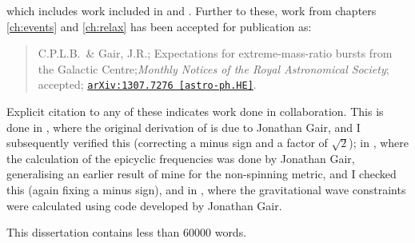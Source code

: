 which includes work included in  and . Further to these, work from chapters \ref{ch:events} and \ref{ch:relax} has been accepted for publication as:
\begin{quote}
C.P.L.B.\ \& Gair, J.R.; Expectations for extreme-mass-ratio bursts from the Galactic Centre;{\it Monthly Notices of the Royal Astronomical Society}; accepted; \href{http://arxiv.org/abs/1307.7276}{\tt arXiv:1307.7276 [astro-ph.HE]}.
\end{quote}
Explicit citation to any of these indicates work done in collaboration. This is done in , where the original derivation of  is due to Jonathan Gair, and I subsequently verified this (correcting a minus sign and a factor of $\sqrt{2}$); in , where the calculation of the epicyclic frequencies was done by Jonathan Gair, generalising an earlier result of mine for the non-spinning metric, and I checked this (again fixing a minus sign), and in , where the gravitational wave constraints were calculated using code developed by Jonathan Gair.

This dissertation contains less than $60000$ words.
